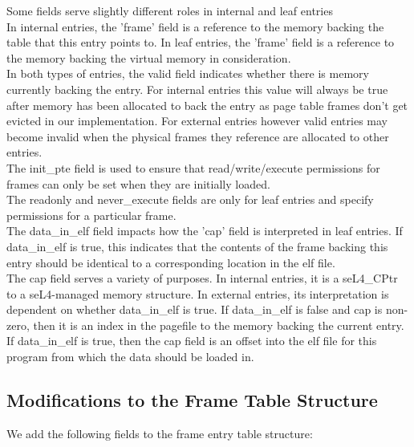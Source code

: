 \noindent
Some fields serve slightly different roles in internal and leaf entries
\\

\noindent
In internal entries, the 'frame' field is a reference to the memory backing
the table that this entry points to. In leaf entries, the 'frame' field
is a reference to the memory backing the virtual memory in consideration.
\\

\noindent
In both types of entries, the valid field indicates whether there is memory
currently backing the entry. For internal entries this value will always be true
after memory has been allocated to back the entry as page table frames
don't get evicted in our implementation. For external entries however
valid entries may become invalid when the physical frames they reference
are allocated to other entries.
\\

\noindent
The init\_pte field is used to ensure that read/write/execute permissions
for frames can only be set when they are initially loaded.
\\

\noindent
The readonly and never\_execute fields are only for leaf entries and
specify permissions for a particular frame.
\\ 

\noindent
The data\_in\_elf field impacts how the 'cap' field is interpreted in leaf
entries. If data\_in\_elf is true, this indicates that the contents of the frame
backing this entry should be identical to a corresponding location 
in the elf file.
\\

\noindent
The cap field serves a variety of purposes. In internal entries, it is a
seL4\_CPtr to a seL4-managed memory structure. In external entries, its
interpretation is dependent on whether data\_in\_elf is true. If data\_in\_elf
is false and cap is non-zero, then it is an index in the pagefile to the memory
backing the current entry. If data\_in\_elf is true, then the cap field
is an offset into the elf file for this program from which the data should
be loaded in.
\\

\subsection{Modifications to the Frame Table Structure}

We add the following fields to the frame entry table structure: 

